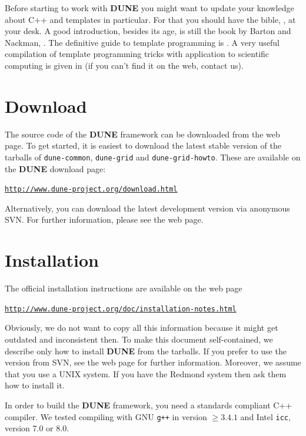 \documentclass[11pt,a4paper,headinclude,footinclude,DIV16,normalheadings]{scrreprt}
\newcommand{\Dune}{{\sf\bfseries DUNE}}
\begin{document}
Before starting to work with \Dune{} you might want to update your
knowledge about C++ and templates in particular. For that you should
have the bible, \cite{Stroustrup}, at your desk. A good introduction,
besides its age, is still the book by Barton and Nackman,
\cite{BN}. The definitive guide to template programming is
\cite{VandervoordeJosuttis}. A very useful compilation of template
programming tricks with application to scientific computing is given
in \cite{Veldhui99} (if you can't find it on the web, contact us).

\section{Download}

The source code of the \Dune{} framework can be
downloaded from the web page.  To get started, it is easiest to
download the latest stable version of the tarballs of
\texttt{dune-common}, \texttt{dune-grid} and \texttt{dune-grid-howto}.
These are available on the \Dune{} download page:
%
\begin{center}
\href{http://www.dune-project.org/download.html}%
{\texttt{http://www.dune-project.org/download.html}}
\end{center}
%

Alternatively, you can download the latest development version via
anonymous SVN.  For further information, please see the web page.

\section{Installation}

The official installation instructions are available on the web page
%
\begin{center}
\href{http://www.dune-project.org/doc/installation-notes.html}%
{\texttt{http://www.dune-project.org/doc/installation-notes.html}}
\end{center}

Obviously, we do not want to copy all this information because it might
get outdated and inconsistent then. To make this document
self-contained, we describe only how to install \Dune{} from the
tarballs.  If you prefer to use the version from SVN, see the web page
for further information.  Moreover, we assume that you use a UNIX
system. If you have the Redmond system then ask them how to install
it.

In order to build the \Dune{} framework, you need a standards
compliant C++ compiler.  We tested compiling with GNU \texttt{g++} in
version $\geq 3.4.1$ and Intel \texttt{icc}, version 7.0 or 8.0.
\end{document}

